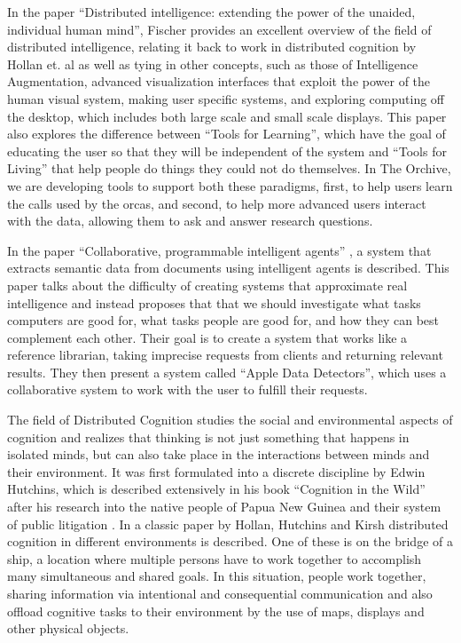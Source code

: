 \documentclass[12pt,oneside]{book}
\begin{document}
In the paper ``Distributed intelligence: extending the power of the
unaided, individual human mind'', \cite{fischer06} Fischer provides an
excellent overview of the field of distributed intelligence, relating
it back to work in distributed cognition by Hollan et. al
\cite{hollan00} as well as tying in other concepts, such as those of
Intelligence Augmentation, advanced visualization interfaces that
exploit the power of the human visual system, making user specific
systems, and exploring computing off the desktop, which includes both
large scale and small scale displays.  This paper also explores the
difference between ``Tools for Learning'', which have the goal of
educating the user so that they will be independent of the system and
``Tools for Living'' that help people do things they could not do
themselves.  In The Orchive, we are developing tools to support both
these paradigms, first, to help users learn the calls used by the
orcas, and second, to help more advanced users interact with the data,
allowing them to ask and answer research questions. 

In the paper ``Collaborative, programmable intelligent agents''
\cite{nardi98}, a system that extracts semantic data from documents
using intelligent agents is described.  This paper talks about the
difficulty of creating systems that approximate real intelligence and
instead proposes that that we should investigate what tasks computers
are good for, what tasks people are good for, and how they can best
complement each other.  Their goal is to create a system that works
like a reference librarian, taking imprecise requests from clients and
returning relevant results.  They then present a system called ``Apple
Data Detectors'', which uses a collaborative system to work with the
user to fulfill their requests.

The field of Distributed Cognition studies the social and
environmental aspects of cognition and realizes that thinking is not
just something that happens in isolated minds, but can also take place
in the interactions between minds and their environment.  It was first
formulated into a discrete discipline by Edwin Hutchins, which is
described extensively in his book ``Cognition in the Wild''
\cite{hutchins96} after his research into the native people of Papua
New Guinea and their system of public litigation \cite{hutchins80}.
In a classic paper by Hollan, Hutchins and Kirsh \cite{hollan00}
distributed cognition in different environments is described.  One of
these is on the bridge of a ship, a location where multiple persons
have to work together to accomplish many simultaneous and shared
goals.  In this situation, people work together, sharing information
via intentional and consequential communication and also offload
cognitive tasks to their environment by the use of maps, displays and
other physical objects.
\end{document}
